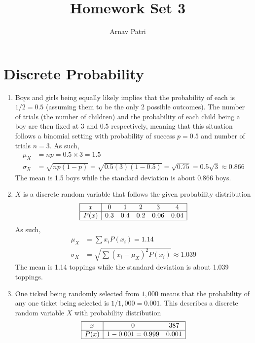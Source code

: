\documentclass[12pt]{article}
\title{Homework Set 3}
\author{Arnav Patri}
\begin{document}
	\maketitle
	\setcounter{section}{6}
	\section{Discrete Probability}
		\begin{enumerate}
			\item	
				Boys and girls being equally likely implies that the probability of each is \(1/2 = 0.5\) (assuming them to be the only 2 possible outcomes). The number of trials (the number of children) and the probability of each child being a boy are then fixed at 3 and 0.5 respectively, meaning that this situation follows a binomial setting with probability of success \(p = 0.5\) and number of trials \(n = 3\). As such,
				\begin{align*}
					\mu_X &= np 
							= 0.5 \times 3 
							= 1.5 \\
					\sigma_X &= \sqrt{np(1 - p)} 
							= \sqrt{0.5(3)(1 - 0.5)} 
							= \sqrt{0.75} 
							= 0.5\sqrt{3} 
							\approx 0.866
				\end{align*}
				The mean is 1.5 boys while the standard deviation is about 0.866 boys.
			\item
				\(X\) is a discrete random variable that follows the given probability distribution
				\[\begin{array}{|c|*{5}{c}|}\hline
					x & 0 & 1 & 2 & 3 & 4 \\\hline
					P(x) & 0.3 & 0.4 & 0.2 & 0.06 & 0.04 \\\hline
				\end{array}\]
				As such,
				\begin{align*}
					\mu_X &= \sum x_iP(x_i)
							= 1.14 \\
					\sigma_X &= \sqrt{\sum(x_i - \mu_X)^2P(x_i)}
							\approx 1.039
				\end{align*}
				The mean is 1.14 toppings while the standard deviation is about 1.039 toppings.
			\item
				One ticked being randomly selected from \(1,000\) means that the probability of any one ticket being selected is \(1/1,000 = 0.001\). This describes a discrete random variable \(X\) with probability distribution
					\[\begin{array}{|c|*{2}{c}|}\hline
						x & 0 & 387 \\\hline
						P(x) & 1 - 0.001 = 0.999 & 0.001 \\\hline

\end{array}\]
\end{enumerate}
\end{document}
